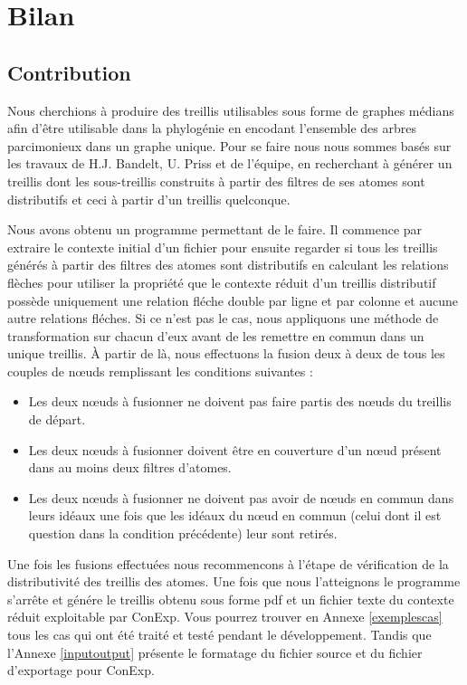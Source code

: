 \chapter{Bilan}

\section{Contribution}

Nous cherchions à produire des treillis utilisables sous forme de graphes médians afin d'être utilisable dans la phylogénie en encodant l'ensemble des arbres parcimonieux dans un graphe unique. Pour se faire nous nous sommes basés sur les travaux de H.J. Bandelt, U. Priss et de l'équipe, en recherchant à générer un treillis dont les sous-treillis construits à partir des filtres de ses atomes sont distributifs et ceci à partir d'un treillis quelconque.

\bigbreak

Nous avons obtenu un programme permettant de le faire. Il commence par extraire le contexte initial d'un fichier pour ensuite regarder si tous les treillis générés à partir des filtres des atomes sont distributifs en calculant les relations flèches pour utiliser la propriété que le contexte réduit d'un treillis distributif possède uniquement une relation fléche double par ligne et par colonne et aucune autre relations fléches. Si ce n'est pas le cas, nous appliquons une méthode de transformation sur chacun d'eux avant de les remettre en commun dans un unique treillis. À partir de là, nous effectuons la fusion deux à deux de tous les couples de n\oe uds remplissant les conditions suivantes :
\begin{itemize}
	\item Les deux n\oe uds à fusionner ne doivent pas faire partis des n\oe uds du treillis de départ.
	\item Les deux n\oe uds à fusionner doivent être en couverture d'un n\oe ud présent dans au moins deux filtres d'atomes.
	\item Les deux n\oe uds à fusionner ne doivent pas avoir de n\oe uds en commun dans leurs idéaux une fois que les idéaux du n\oe ud en commun (celui dont il est question dans la condition précédente) leur sont retirés.
\end{itemize}
Une fois les fusions effectuées nous recommencons à l'étape de vérification de la distributivité des treillis des atomes. Une fois que nous l'atteignons le programme s'arrête et génére le treillis obtenu sous forme pdf et un fichier texte du contexte réduit exploitable par ConExp. Vous pourrez trouver en Annexe \ref{exemplescas} tous les cas qui ont été traité et testé pendant le développement. Tandis que l'Annexe \ref{inputoutput} présente le formatage du fichier source et du fichier d'exportage pour ConExp.

